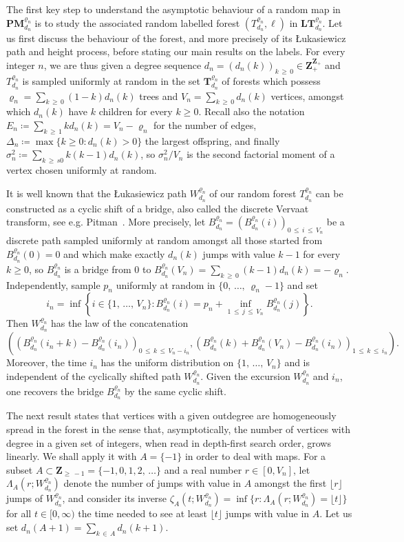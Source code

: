\documentclass[10pt]{amsart}
\theoremstyle{definition}\newtheorem{defi}[theo]{Definition}\newtheorem{rema}[theo]{Remark}\newtheorem{exam}[theo]{Example}\newtheorem{exem}[theo]{Example}\newtheorem{nota}[theo]{Notation}
\newcommand{\ensembles}[1]{\mathbf{#1}}
\newcommand{\Z}{\ensembles{Z}}
\newcommand{\1}{\ensembles{1}}
\newcommand{\Tree}{\mathbf{T}}
\newcommand{\PMap}{\mathbf{PM}}
\newcommand{\LTree}{\mathbf{LT}}
\renewcommand{\le}{\leqslant}
\renewcommand{\ge}{\geqslant}
\newcommand{\Fn}{\Tree_{d_n}^{\varrho_n}}
\newcommand{\PMn}{\PMap_{d_n}^{\varrho_n}}
\newcommand{\fn}{T_{d_n}^{\varrho_n}}
\newcommand{\LFn}{\LTree_{d_n}^{\varrho_n}}
\newcommand{\Wfn}{W_{d_n}^{\varrho_n}}
\newcommand{\Bfn}{B_{d_n}^{\varrho_n}}
\newcommand{\edges}{E}
\newcommand{\vertices}{V}
\providecommand{\?}{}
\begin{document}
The first key step to understand the asymptotic behaviour of a random map in $\PMn$ is to study the associated random labelled forest $(\fn, \ell)$ in $\LFn$. Let us first discuss the behaviour of the forest, and more precisely of its \L ukasiewicz path and height process, before stating our main results on the labels. For every integer $n$, we are thus given a degree sequence $d_n = (d_n(k))_{k\,\ge\,0} \in \Z_+^{\Z_+}$ and $\fn$ is sampled uniformly at random in the set $\Fn$ of forests which possess $\varrho_n = \sum_{k\,\ge\,0} (1-k) d_n(k)$ trees and $\vertices_n = \sum_{k\,\ge\,0} d_n(k)$ vertices, amongst which $d_n(k)$ have $k$ children for every $k \ge 0$. Recall also the notation $\edges_n \coloneqq \sum_{k\,\ge\,1} k d_n(k) = \vertices_n - \varrho_n$ for the number of edges, $\Delta_n \coloneqq \max\{k \ge 0 : d_n(k) > 0\}$ the largest offspring, and finally $\sigma_n^2 \coloneqq \sum_{k\,\ge\,s0} k (k-1) d_n(k)$, so $\sigma_n^2/\vertices_n$ is the second factorial moment of a vertex chosen uniformly at random.



It is well known that the {\L}ukasiewicz path $\Wfn$ of our random forest $\fn$ can be constructed as a cyclic shift of a bridge, also called the discrete Vervaat transform, see e.g. Pitman~\cite[Chapter~6]{Pit06}. More precisely, let $\Bfn = (\Bfn(i))_{0\,\le\,i\, \le\,\vertices_n}$ be a discrete path sampled uniformly at random amongst all those started from $\Bfn(0) = 0$ and which make exactly $d_n(k)$ jumps with value $k-1$ for every $k \ge 0$, so $\Bfn$ is a bridge from $0$ to $\Bfn(\vertices_n) = \sum_{k\,\ge\,0} (k - 1) d_n(k) = - \varrho_n$. Independently, sample $p_n$ uniformly at random in $\{0,\,\dots,\,\varrho_n-1\}$ and set
\[
i_n = \inf\left\{i \in\{1,\,\dots, \,\vertices_n\} : \Bfn(i) = p_n + \inf_{1\,\le \,j\,\le\,\vertices_n} \Bfn(j)\right\}.
\]
Then $\Wfn$ has the law of the concatenation
\[
\left(\left(\Bfn(i_n+k) - \Bfn(i_n)\right)_{0 \,\le\,k\,\le\,\vertices_n-i_n}, \left(\Bfn(k) + \Bfn(\vertices_n) - \Bfn(i_n)\right)_{1\,\le\,k\,\le\,i_n}\right).
\]
Moreover, the time $i_n$ has the uniform distribution on $\{1,\,\dots,\,\vertices_n\}$ and is independent of the cyclically shifted path $\Wfn$. Given the excursion $\Wfn$ and $i_n$, one recovers the bridge $\Bfn$ by the same cyclic shift.


The next result states that vertices with a given outdegree are homogeneously spread in the forest in the sense that, asymptotically, the number of vertices with degree in a given set of integers, when read in depth-first search order, grows linearly. We shall apply it with $A = \{-1\}$ in order to deal with maps. For a subset $A \subset \Z_{\ge\,-1} = \{-1, 0, 1, 2,\,\dots\}$ and a real number $r \in [0, \vertices_n]$, let $\Lambda_A(r; \Wfn)$ denote the number of jumps with value in $A$ amongst the first $\lfloor r\rfloor$ jumps of $\Wfn$, and consider its inverse $\zeta_A(t; \Wfn) = \inf\{r : \Lambda_A(r; \Wfn) = \lfloor t\rfloor\}$ for all $t \in [0, \infty)$ the time needed to see at least $\lfloor t\rfloor$ jumps with value in $A$. Let us set $d_n(A + 1) = \sum_{k\,\in\,A} d_n(k+1)$.
\end{document}
